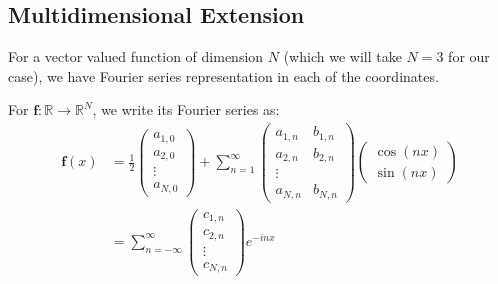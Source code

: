 \documentclass[a4paper]{article}
\begin{document}
\subsection{Multidimensional Extension}
For a vector valued function of dimension $N$ (which we will take $N=3$ for our case), we have Fourier series representation in each of the coordinates.

For $\mathbf{f}:\mathbb{R} \rightarrow \mathbb{R}^N$, we write its Fourier series as:
\begin{align}
    \mathbf{f} (x) &= \frac{1}{2}
    \begin{pmatrix}
        a_{1,0} \\
        a_{2,0} \\
        \vdots \\
        a_{N,0}
    \end{pmatrix}
    + \sum_{n=1}^\infty
    \begin{pmatrix}
        a_{1,n} & b_{1,n} \\
        a_{2,n} & b_{2,n} \\
        \vdots \\
        a_{N,n} & b_{N,n}
    \end{pmatrix}
    \begin{pmatrix}
        \cos {\left( nx \right)} \\
        \sin {\left( nx \right)}
    \end{pmatrix}
    \\
    &= \sum_{n=-\infty}^{\infty}
    \begin{pmatrix}
        c_{1,n} \\
        c_{2,n} \\
        \vdots \\
        c_{N,n}
    \end{pmatrix}
    e^{-inx}
\end{align}
\end{document}

